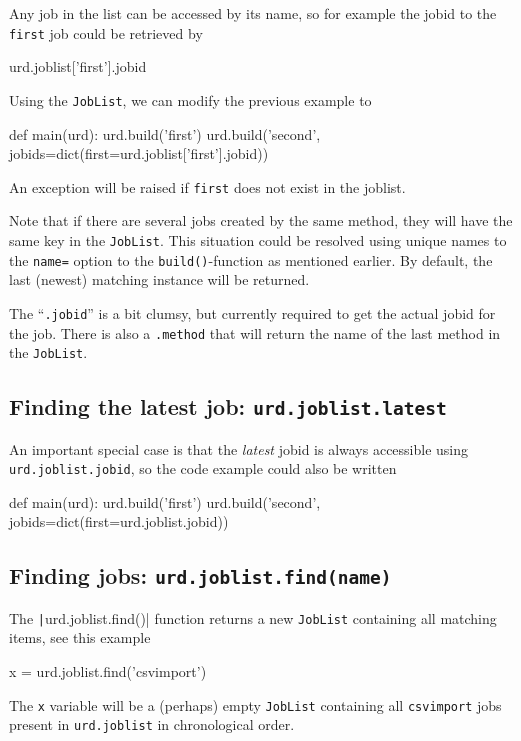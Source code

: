 Any job in the list can be accessed by its name, so for example the
jobid to the \texttt{first} job could be retrieved by
\begin{python}
urd.joblist['first'].jobid
\end{python}
Using the \texttt{JobList}, we can modify the previous example to
\begin{python}
def main(urd):
    urd.build('first')
    urd.build('second', jobids=dict(first=urd.joblist['first'].jobid))
\end{python}
An exception will be raised if \texttt{first} does not exist in the
joblist.

Note that if there are several jobs created by the same method, they
will have the same key in the \texttt{JobList}.  This situation could be
resolved using unique names to the \texttt{name=} option to
the \texttt{build()}-function as mentioned earlier.  By default, the
last (newest) matching instance will be returned.

The ``\texttt{.jobid}'' is a bit clumsy, but currently required to get
the actual jobid for the job.  There is also a \texttt{.method} that
will return the name of the last method in the \texttt{JobList}.



\subsection{Finding the latest job:  \texttt{urd.joblist.latest}}

An important special case is that the \textsl{latest} jobid is always
accessible using \texttt{urd.joblist.jobid}, so the code example could
also be written
\begin{python}
def main(urd):
    urd.build('first')
    urd.build('second', jobids=dict(first=urd.joblist.jobid))
\end{python}



\subsection{Finding jobs:  \texttt{urd.joblist.find(name)}}

The \texttt|urd.joblist.find()| function returns a
new \texttt{JobList} containing all matching items, see this example
\begin{python}
x = urd.joblist.find('csvimport')
\end{python}
The \texttt{x} variable will be a (perhaps) empty \texttt{JobList} containing
all \texttt{csvimport} jobs present in \texttt{urd.joblist} in
chronological order.



